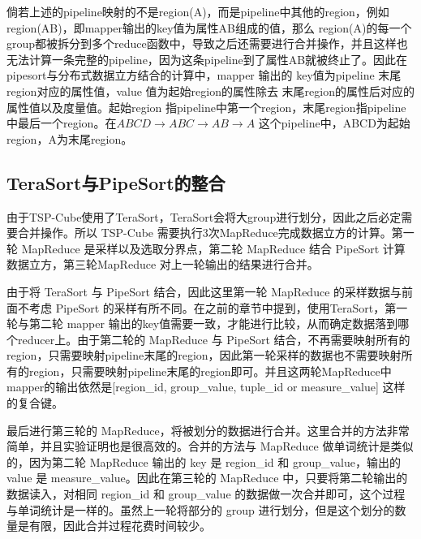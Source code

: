 倘若上述的pipeline映射的不是region(A)，而是pipeline中其他的region，例如region(AB)，即mapper输出的key值为属性AB组成的值，那么 region(A)的每一个group都被拆分到多个reduce函数中，导致之后还需要进行合并操作，并且这样也无法计算一条完整的pipeline，因为这条pipeline到了属性AB就被终止了。因此在pipesort与分布式数据立方结合的计算中，mapper 输出的 key值为pipeline 末尾region对应的属性值，value 值为起始region的属性除去 末尾region的属性后对应的属性值以及度量值。起始region 指pipeline中第一个region，末尾region指pipeline中最后一个region。在$ABCD\rightarrow ABC\rightarrow AB\rightarrow A$ 这个pipeline中，ABCD为起始region，A为末尾region。



\subsection{TeraSort与PipeSort的整合}

由于TSP-Cube使用了TeraSort，TeraSort会将大group进行划分，因此之后必定需要合并操作。所以 TSP-Cube 需要执行3次MapReduce完成数据立方的计算。第一轮 MapReduce 是采样以及选取分界点，第二轮 MapReduce 结合 PipeSort 计算数据立方，第三轮MapReduce 对上一轮输出的结果进行合并。

由于将 TeraSort 与 PipeSort 结合，因此这里第一轮 MapReduce 的采样数据与前面不考虑 PipeSort 的采样有所不同。在之前的章节中提到，使用TeraSort，第一轮与第二轮 mapper 输出的key值需要一致，才能进行比较，从而确定数据落到哪个reducer上。由于第二轮的 MapReduce 与 PipeSort 结合，不再需要映射所有的region，只需要映射pipeline末尾的region，因此第一轮采样的数据也不需要映射所有的region，只需要映射pipeline末尾的region即可。并且这两轮MapReduce中 mapper的输出依然是[region\_id, group\_value, tuple\_id or measure\_value] 这样的复合键。



最后进行第三轮的 MapReduce，将被划分的数据进行合并。这里合并的方法非常简单，并且实验证明也是很高效的。合并的方法与 MapReduce 做单词统计是类似的，因为第二轮 MapReduce 输出的 key 是 region\_id 和 group\_value，输出的 value 是 measure\_value。因此在第三轮的 MapReduce 中，只要将第二轮输出的数据读入，对相同 region\_id 和 group\_value 的数据做一次合并即可，这个过程与单词统计是一样的。虽然上一轮将部分的 group 进行划分，但是这个划分的数量是有限，因此合并过程花费时间较少。


